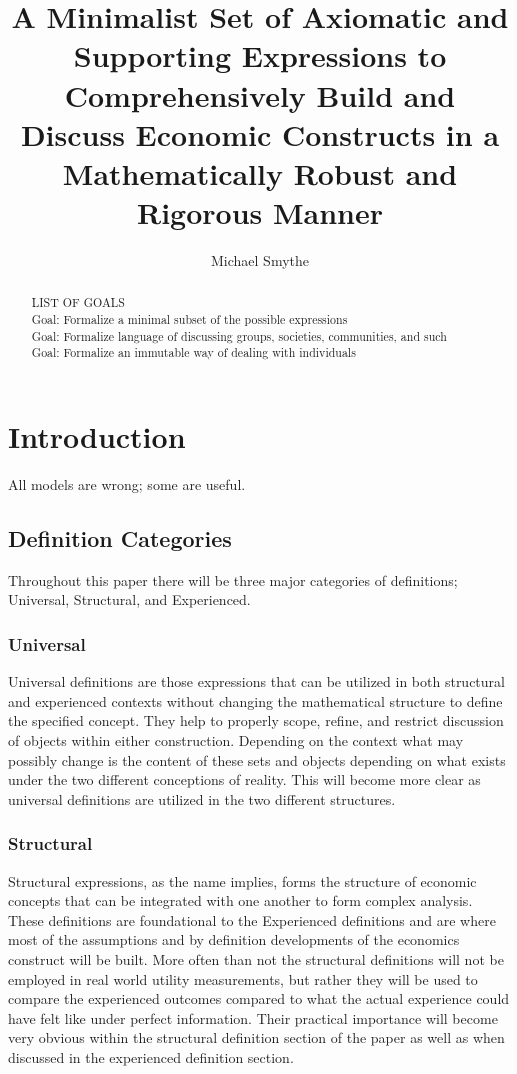 \documentclass[]{article}
\title{A Minimalist Set of Axiomatic and Supporting Expressions to Comprehensively Build and Discuss Economic Constructs in a Mathematically Robust and Rigorous Manner}
\author{Michael Smythe}
\begin{document}
\maketitle

\begin{abstract}
LIST OF GOALS
\\Goal: Formalize a minimal subset of the possible expressions
\\Goal: Formalize language of discussing groups, societies, communities, and such
\\Goal: Formalize an immutable way of dealing with individuals
\end{abstract}
\section*{Introduction}
All models are wrong; some are useful. 
\subsection*{Definition Categories}
Throughout this paper there will be three major categories of definitions; Universal, Structural, and Experienced.
%
\subsubsection*{Universal}
Universal definitions are those expressions that can be utilized in both structural and experienced contexts without changing the mathematical structure to define the specified concept. They help to properly scope, refine, and restrict discussion of objects within either construction. Depending on the context what may possibly change is the content of these sets and objects depending on what exists under the two different conceptions of reality. This will become more clear as universal definitions are utilized in the two different structures.  
%
\subsubsection*{Structural}
Structural expressions, as the name implies, forms the structure of economic concepts that can be integrated with one another to form complex analysis. These definitions are foundational to the Experienced definitions and are where most of the assumptions and by definition developments of the economics construct will be built. More often than not the structural definitions will not be employed in real world utility measurements, but rather they will be used to compare the experienced outcomes compared to what the actual experience could have felt like under perfect information. Their practical importance will become very obvious within the structural definition section of the paper as well as when discussed in the experienced definition section. 
%
\end{document}
